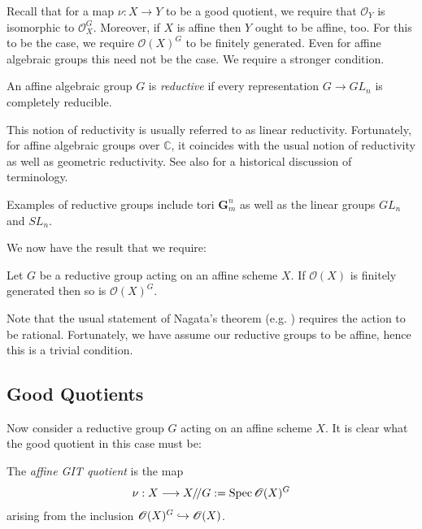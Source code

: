 \documentclass[12pt]{ociamthesis}  %
\begin{document}
Recall that for a map $\nu : X\to Y$ to be a good quotient, we
require that $\mathscr O_Y$ is isomorphic to $\mathscr O_X^G$.
Moreover, if $X$ is affine then $Y$ ought to be affine, too. For
this to be the case, we require $\mathscr O(X)^G$ to be
finitely generated. Even for affine algebraic groups this
need not be the case. We require a stronger condition.

\begin{definition}
  An affine algebraic group $G$ is \emph{reductive} if every
  representation $G\to GL_n$ is completely reducible.
\end{definition}

This notion of reductivity is usually referred to as linear
reductivity. Fortunately, for affine algebraic groups over $\mathbb C$,
it coincides with the usual notion of reductivity as well as
geometric reductivity. \cite[Theorem 4.6]{hoskins2016} See also
\cite[40-42]{newstead1978} for a historical discussion of terminology.

\begin{example}
  Examples of reductive groups include tori $\mathbf G_m^n$ as well
  as the linear groups $GL_n$ and $SL_n$.
\end{example}

We now have the result that we require:

\begin{theorem}[Nagata]
  Let $G$ be a reductive group acting on an affine scheme $X$.
  If $\mathscr O(X)$ is finitely generated then so is $\mathscr O(X)^G$.
\end{theorem}

Note that the usual statement of Nagata's theorem
(e.g. \cite[Theorem 3.4]{newstead1978}) requires the action to be rational.
Fortunately, we have assume our reductive groups to be affine, hence
this is a trivial condition. \cite[Lemma 3.8]{hoskins2016}

\subsection{Good Quotients}

Now consider a reductive group $G$ acting on an affine scheme $X$. It is
clear what the good quotient in this case must be:

\begin{definition}
  The \emph{affine GIT quotient} is the map
  \begin{align*}
    \nu : X \longrightarrow X/\!/ G := \operatorname{Spec}\mathscr O(X)^G
  \end{align*}
  arising from the inclusion $\mathscr O(X)^G \hookrightarrow \mathscr O(X)$.
\end{definition}
\end{document}
